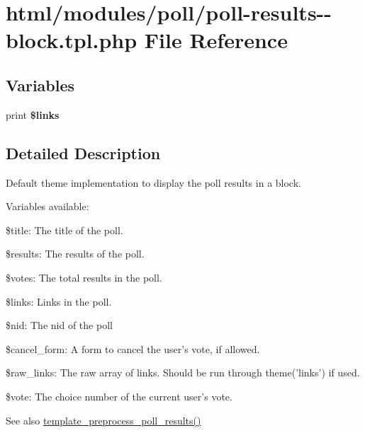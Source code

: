 \hypertarget{poll-results--block_8tpl_8php}{
\section{html/modules/poll/poll-\/results-\/-\/block.tpl.php File Reference}
\label{poll-results--block_8tpl_8php}
}
\subsection*{Variables}
\begin{DoxyCompactItemize}
\item 
\hypertarget{poll-results--block_8tpl_8php_a67aa641b75422875f72695353fd225ca}{
print {\bfseries \$links}}
\label{poll-results--block_8tpl_8php_a67aa641b75422875f72695353fd225ca}

\end{DoxyCompactItemize}


\subsection{Detailed Description}
Default theme implementation to display the poll results in a block.

Variables available:
\begin{DoxyItemize}
\item \$title: The title of the poll.
\item \$results: The results of the poll.
\item \$votes: The total results in the poll.
\item \$links: Links in the poll.
\item \$nid: The nid of the poll
\item \$cancel\_\-form: A form to cancel the user's vote, if allowed.
\item \$raw\_\-links: The raw array of links. Should be run through theme('links') if used.
\item \$vote: The choice number of the current user's vote.
\end{DoxyItemize}

\begin{DoxySeeAlso}{See also}
\hyperlink{poll_8module_a4797e0810a85deacc6dcc9bedf24d235}{template\_\-preprocess\_\-poll\_\-results()} 
\end{DoxySeeAlso}
